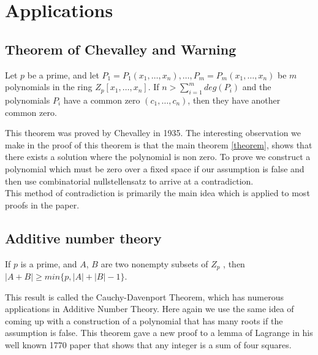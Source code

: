 \section{Applications}
\subsection{Theorem of Chevalley and Warning}
\begin{theorem}
	Let $p$ be a prime, and let $P_1 = P_1(x_1 , \ldots , x_n), \ldots , P_m = P_m(x_1 , \ldots , x_n)$ be $m$ polynomials in the ring $Z_p[x_1 , \ldots , x_n]$. If $n > \sum_{i=1}^{m}deg(P_i)$ and the polynomials $P_i$ have a common zero $(c_1 , \ldots , c_n)$, then they have another common zero.
\end{theorem}
This theorem was proved by Chevalley in 1935. The interesting observation we make in the proof of this theorem is that the main theorem \ref{theorem}, shows that there exists a solution where the polynomial is non zero. To prove we construct a polynomial which must be zero over a fixed space if our assumption is false and then use combinatorial nullstellensatz to arrive at a contradiction.
\\
This method of contradiction is primarily the main idea which is applied to most proofs in the paper.
\subsection{Additive number theory}
\begin{theorem}
	If $p$ is a prime, and $A$, $B$ are two nonempty subsets of $Z_p$ , then 
	\\
	$|A + B| \geq min \{p, |A| + |B| - 1 \}$.
\end{theorem}
This result is called the Cauchy-Davenport Theorem, which has numerous applications in Additive Number Theory. Here again we use the same idea of coming up with a construction of a polynomial that has many roots if the assumption is false. This theorem gave a new proof to a lemma of Lagrange in his well known 1770 paper that shows that any integer is a sum of four squares.
